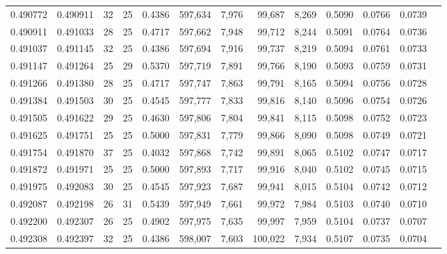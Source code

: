 \begin{tabular}{rrrrrrrrrrrrr}
0.490772 & 0.490911 &    32 &  25 &                                     0.4386 & 597,634 &   7,976 &  99,687 &   8,269 & 0.5090 & 0.0766 & 0.0739 \\
0.490911 & 0.491033 &    28 &  25 &                                     0.4717 & 597,662 &   7,948 &  99,712 &   8,244 & 0.5091 & 0.0764 & 0.0736 \\
0.491037 & 0.491145 &    32 &  25 &                                     0.4386 & 597,694 &   7,916 &  99,737 &   8,219 & 0.5094 & 0.0761 & 0.0733 \\
0.491147 & 0.491264 &    25 &  29 &                                     0.5370 & 597,719 &   7,891 &  99,766 &   8,190 & 0.5093 & 0.0759 & 0.0731 \\
0.491266 & 0.491380 &    28 &  25 &                                     0.4717 & 597,747 &   7,863 &  99,791 &   8,165 & 0.5094 & 0.0756 & 0.0728 \\
0.491384 & 0.491503 &    30 &  25 &                                     0.4545 & 597,777 &   7,833 &  99,816 &   8,140 & 0.5096 & 0.0754 & 0.0726 \\
0.491505 & 0.491622 &    29 &  25 &                                     0.4630 & 597,806 &   7,804 &  99,841 &   8,115 & 0.5098 & 0.0752 & 0.0723 \\
0.491625 & 0.491751 &    25 &  25 &                                     0.5000 & 597,831 &   7,779 &  99,866 &   8,090 & 0.5098 & 0.0749 & 0.0721 \\
0.491754 & 0.491870 &    37 &  25 &                                     0.4032 & 597,868 &   7,742 &  99,891 &   8,065 & 0.5102 & 0.0747 & 0.0717 \\
0.491872 & 0.491971 &    25 &  25 &                                     0.5000 & 597,893 &   7,717 &  99,916 &   8,040 & 0.5102 & 0.0745 & 0.0715 \\
0.491975 & 0.492083 &    30 &  25 &                                     0.4545 & 597,923 &   7,687 &  99,941 &   8,015 & 0.5104 & 0.0742 & 0.0712 \\
0.492087 & 0.492198 &    26 &  31 &                                     0.5439 & 597,949 &   7,661 &  99,972 &   7,984 & 0.5103 & 0.0740 & 0.0710 \\
0.492200 & 0.492307 &    26 &  25 &                                     0.4902 & 597,975 &   7,635 &  99,997 &   7,959 & 0.5104 & 0.0737 & 0.0707 \\
0.492308 & 0.492397 &    32 &  25 &                                     0.4386 & 598,007 &   7,603 & 100,022 &   7,934 & 0.5107 & 0.0735 & 0.0704 \\

\end{tabular}
